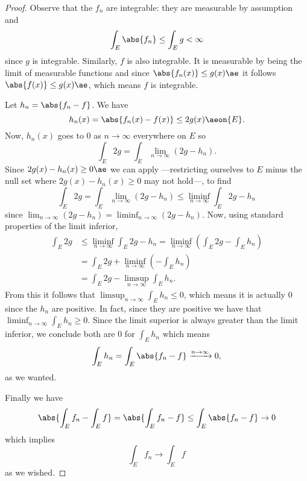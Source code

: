 \documentclass[12pt,oneside]{book}
\begin{document}
\begin{proof}
	Observe that the \( f_n \) are integrable: they are measurable by assumption and
	\begin{equation*}
		\int_E \abs{f_n} \leq \int_E g < \infty 
	\end{equation*}
	since \( g \) is integrable. Similarly, \( f \) is also integrable. It is measurable by
	being the limit of measurable functions and since \( \abs{f_n(x)} \leq g(x) \ae \) it
	follows \( \abs{f(x)} \leq g(x) \ae \), which means \( f \) is integrable.

	Let \( h_n = \abs{f_n - f} \). We have
	\begin{equation*}
		h_n(x) = \abs{f_n(x) - f(x)} \leq 2g(x) \aeon{E}.
	\end{equation*}
	Now, \( h_n(x) \) goes to 0 as \( n \to \infty \) everywhere on \( E \) so
	\begin{equation*}
		\int_E 2g = \int_E \lim_{n \to \infty} (2g - h_n).
	\end{equation*}
	Since \( 2g(x) - h_n(x) \geq 0 \ae \) we can apply  ---restricting
	ourselves to \( E \) minus the null set where \( 2g(x) - h_n(x) \geq 0 \) may not
	hold---, to find
	\begin{equation*}
		\int_E 2g = \int_E \lim_{n \to \infty} (2g - h_n) \leq \liminf_{n \to \infty} \int_E
		2g - h_n
	\end{equation*}
	since \( \lim_{n \to \infty} (2g - h_n) = \liminf_{n \to \infty }(2g - h_n) \). Now,
	using standard properties of the limit inferior,
	\begin{align*}
		\int_E 2g & \leq \liminf_{n \to \infty} \int_E 2g - h_n = \liminf_{n \to \infty}
		\left(\int_E 2g - \int_E h_n\right) \\
							& = \int_E 2g + \liminf_{n \to \infty} \left(- \int_E h_n\right) \\
							& = \int_E 2g - \limsup_{n \to \infty} \int_E
							h_n.
	\end{align*}
	From this it follows that \( \limsup_{n \to \infty} \int_E h_n \leq 0 \), which means it
	is actually 0 since the \( h_n \) are positive. In fact, since they are positive we have
	that \( \liminf_{n \to \infty} \int_E h_n \geq 0 \). Since the limit superior is always
	greater than the limit inferior, we conclude both are 0 for \( \int_E h_n \) which means
	\begin{equation*}
		\int_E h_n = \int_E \abs{f_n - f} \xrightarrow{n \to \infty} 0,
	\end{equation*}
	as we wanted.	

	Finally we have
	\begin{equation*}
		\abs{\int_E f_n  - \int_E f} = \abs{\int_E f_n - f} \leq \int_E \abs{f_n - f} \to 0
	\end{equation*}
	which implies
	\begin{equation*}
		\int_E f_n \to \int_E f
	\end{equation*}
	as we wished.
\end{proof}
\end{document}
